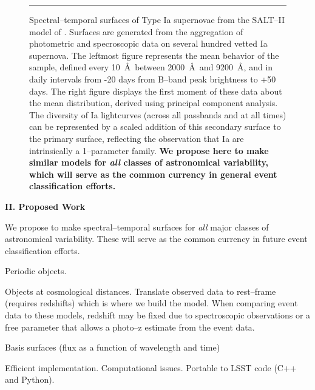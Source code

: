 \begin{figure}[t]
\centerline{ \hfil
{}} \smallskip
\caption[]{\footnotesize Spectral--temporal surfaces of Type Ia supernovae from
the SALT--II model of \cite{2007A&A...466...11G}.  Surfaces are generated from
the aggregation of photometric and specroscopic data on several hundred vetted
Ia supernova.  The leftmost figure represents the mean behavior of the sample,
defined every 10~\AA~between 2000~\AA~and 9200~\AA, and in daily intervals from
-20 days from B--band peak brightness to +50 days.  The right figure displays
the first moment of these data about the mean distribution, derived using
principal component analysis.  The diversity of Ia lightcurves (across all
passbands and at all times) can be represented by a scaled addition of this
secondary surface to the primary surface, reflecting the observation that Ia are
intrinsically a 1--parameter family.  {\bf We propose here to make similar
models for {\it all} classes of astronomical variability, which will serve as
the common currency in general event classification efforts.}} \medskip \hrule
\label{fig:salt2} \end{figure}



\bigskip \centerline{\bf II. Proposed Work} \smallskip

We propose to make spectral--temporal surfaces for {\it all} major classes of
astronomical variability. These will serve as the common currency in future
event classification efforts.

 


Periodic objects.

Objects at cosmological distances.  Translate observed data to rest--frame
(requires redshifts) which is where we build the model.  When comparing event
data to these models, redshift may be fixed due to spectroscopic observations or
a free parameter that allows a photo--z estimate from the event data.

Basis surfaces (flux as a function of wavelength and time)


 

Efficient implementation.  Computational issues.  Portable to LSST code (C++ and
Python).

